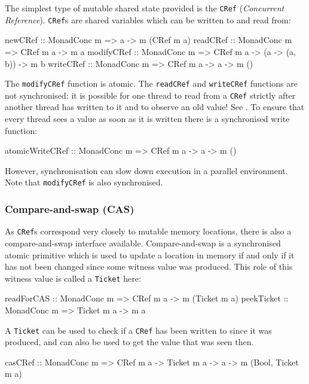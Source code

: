 The simplest type of mutable shared state provided is the \verb|CRef|
(\emph{Concurrent Reference}). \verb|CRef|s are shared variables which
can be written to and read from:

\begin{haskellcode}
newCRef    :: MonadConc m => a -> m (CRef m a)
readCRef   :: MonadConc m => CRef m a -> m a
modifyCRef :: MonadConc m => CRef m a -> (a -> (a, b)) -> m b
writeCRef  :: MonadConc m => CRef m a -> a -> m ()
\end{haskellcode}

The \verb|modifyCRef| function is atomic. The \verb|readCRef| and
\verb|writeCRef| functions are not synchronised: it is possible for
one thread to read from a \verb|CRef| strictly after another thread
has written to it and to observe an old value! See
. To ensure that every thread sees a value as
soon as it is written there is a synchronised write function:

\begin{haskellcode}
atomicWriteCRef :: MonadConc m => CRef m a -> a -> m ()
\end{haskellcode}

However, synchronisation can slow down execution in a parallel
environment. Note that \verb|modifyCRef| is also synchronised.

\subsubsection{Compare-and-swap (CAS)}
\label{sec:abstraction-typeclass-cas}

As \verb|CRef|s correspond very closely to mutable memory locations,
there is also a compare-and-swap interface available. Compare-and-swap
is a synchronised atomic primitive which is used to update a location
in memory if and only if it has not been changed since some witness
value was produced. This role of this witness value is called a
\verb|Ticket| here:

\begin{haskellcode}
readForCAS :: MonadConc m => CRef m a -> m (Ticket m a)
peekTicket :: MonadConc m => Ticket m a -> m a
\end{haskellcode}

A \verb|Ticket| can be used to check if a \verb|CRef| has been written
to since it was produced, and can also be used to get the value that
was seen then.

\begin{haskellcode}
casCRef :: MonadConc m => CRef m a -> Ticket m a -> a -> m (Bool, Ticket m a)
\end{haskellcode}

